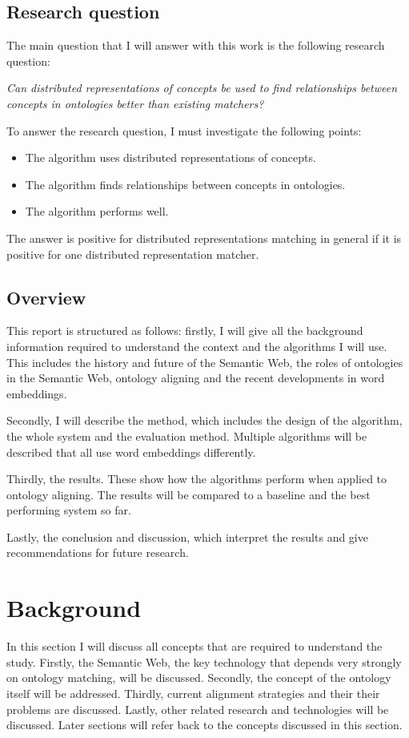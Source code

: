 \documentclass{article}
\begin{document}
 \subsection{Research question} \label{researchquestion}
 The main question that I will answer with this work is the following research question:
 
 \begin{center}
 \textit{
 Can distributed representations of concepts be used to find relationships between concepts in ontologies better than existing matchers?
 }
 \end{center}
 
 To answer the research question, I must investigate the following points:
 \begin{itemize}
 \item The algorithm uses distributed representations of concepts.
 \item The algorithm finds relationships between concepts in ontologies.
 \item The algorithm performs well.
 \end{itemize}
 
 The answer is positive for distributed representations matching in general if it is positive for one distributed representation matcher.
 
 \subsection{Overview}
 This report is structured as follows: firstly, I will give all the background information required to understand the context and the algorithms I will use. This includes the history and future of the Semantic Web, the roles of ontologies in the Semantic Web, ontology aligning and the recent developments in word embeddings.
 
 Secondly, I will describe the method, which includes the design of the algorithm, the whole system and the evaluation method. Multiple algorithms will be described that all use word embeddings differently. 
 
 Thirdly, the results. These show how the algorithms perform when applied to ontology aligning. The results will be compared to a baseline and the best performing system so far.
 
 Lastly, the conclusion and discussion, which interpret the results and give recommendations for future research.
 
\newpage
\section{Background}
 In this section I will discuss all concepts that are required to understand the study. Firstly, the Semantic Web, the key technology that depends very strongly on ontology matching, will be discussed. Secondly, the concept of the ontology itself will be addressed. Thirdly, current alignment strategies and their their problems are discussed. Lastly, other related research and technologies will be discussed. Later sections will refer back to the concepts discussed in this section.
\end{document}
